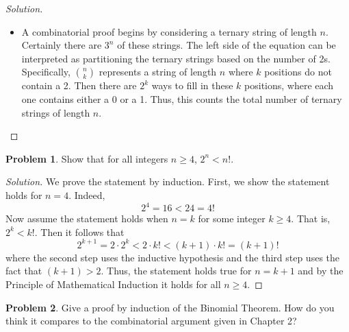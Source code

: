 \documentclass[12pt]{article}
\theoremstyle{definition}
\newtheorem{problem-internal}{Problem}[]
\newenvironment{problem}{
  \medskip
  \begin{problem-internal}
}{
\end{problem-internal}
}
\newenvironment{solution}{
  \begin{proof}[Solution]
    \vspace{-8px}
    \setlength{\parskip}{4px}
    \setlength{\parindent}{0px}
}{
\end{proof}
}
\begin{document}
\begin{solution}
\begin{enumerate}[label={(\alph*)}]
\begin{itemize}
        \item A combinatorial proof begins by considering a ternary string of length \(n\). Certainly there are \(3^n\) of these strings. The left side of the equation can be interpreted as partitioning the ternary strings based on the number of 2s. Specifically, \({n \choose k}\) represents a string of length \(n\) where \(k\) positions do not contain a 2. Then there are \(2^k\) ways to fill in these \(k\) positions, where each one contains either a 0 or a 1. Thus, this counts the total number of ternary strings of length \(n\). \qedhere
      \end{itemize}
    \end{enumerate}
  \end{solution}

  \begin{problem}
    Show that for all integers $n \geq 4$, $2^{n} < n!$.
  \end{problem}
  \begin{solution}
    We prove the statement by induction. First, we show the statement holds for $n=4$. Indeed,
    \[ 2^{4} = 16 < 24 = 4! \]
    Now assume the statement holds when $n=k$ for some integer $k \geq 4$. That is, $2^{k} < k!$. Then it follows that
    \[2^{k + 1} = 2 \cdot 2^{k} < 2 \cdot k! < (k+1) \cdot k! = (k+1)! \]
    where the second step uses the inductive hypothesis and the third step uses the fact that $(k + 1) > 2$. Thus, the statement holds true for $n = k + 1$ and by the Principle of Mathematical Induction it holds for all $n \geq 4$.
  \end{solution}

  \begin{problem}
    Give a proof by induction of the Binomial Theorem. How do you think it compares to the combinatorial argument given in Chapter 2?
  \end{problem}
\end{document}
